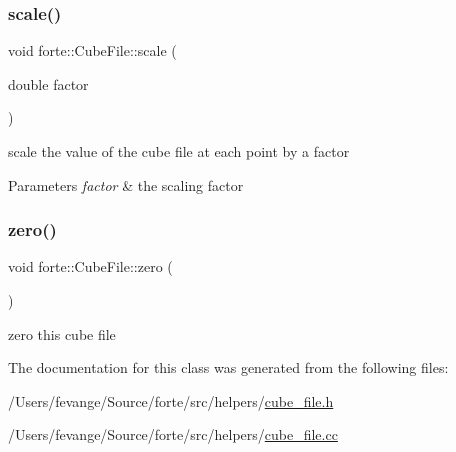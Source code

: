 \subsubsection{\texorpdfstring{scale()}{scale()}}
{\footnotesize\ttfamily void forte\+::\+Cube\+File\+::scale (\begin{DoxyParamCaption}\item[{double}]{factor }\end{DoxyParamCaption})}



scale the value of the cube file at each point by a factor 


\begin{DoxyParams}{Parameters}
{\em factor} & the scaling factor \\
\hline
\end{DoxyParams}
\mbox{\label{classforte_1_1_cube_file_a1f6886f860b2388a7898d61dc493f58e}} 
\subsubsection{\texorpdfstring{zero()}{zero()}}
{\footnotesize\ttfamily void forte\+::\+Cube\+File\+::zero (\begin{DoxyParamCaption}{ }\end{DoxyParamCaption})}



zero this cube file 



The documentation for this class was generated from the following files\+:\begin{DoxyCompactItemize}
\item 
/\+Users/fevange/\+Source/forte/src/helpers/\mbox{\hyperlink{cube__file_8h}{cube\+\_\+file.\+h}}\item 
/\+Users/fevange/\+Source/forte/src/helpers/\mbox{\hyperlink{cube__file_8cc}{cube\+\_\+file.\+cc}}\end{DoxyCompactItemize}
